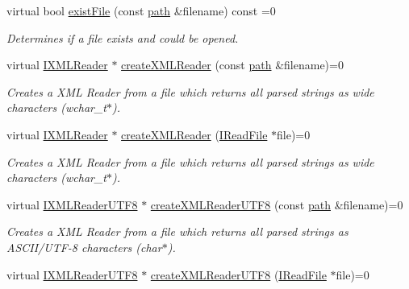 \begin{DoxyCompactItemize}
virtual bool \hyperlink{classirr_1_1io_1_1IFileSystem_a1c5e98bc16e38b1d15b44e24b1b3bd32}{exist\+File} (const \hyperlink{namespaceirr_1_1io_a6468281622ce3a1c46b72e19f32dded5}{path} \&filename) const =0
\begin{DoxyCompactList}\small\item\em Determines if a file exists and could be opened. \end{DoxyCompactList}\item 
virtual \hyperlink{namespaceirr_1_1io_ab620b13630f0818f3eefc000f6917fe4}{I\+X\+M\+L\+Reader} $\ast$ \hyperlink{classirr_1_1io_1_1IFileSystem_a167c9fa159d16ee5c56c074636b0865e}{create\+X\+M\+L\+Reader} (const \hyperlink{namespaceirr_1_1io_a6468281622ce3a1c46b72e19f32dded5}{path} \&filename)=0
\begin{DoxyCompactList}\small\item\em Creates a X\+ML Reader from a file which returns all parsed strings as wide characters (wchar\+\_\+t$\ast$). \end{DoxyCompactList}\item 
virtual \hyperlink{namespaceirr_1_1io_ab620b13630f0818f3eefc000f6917fe4}{I\+X\+M\+L\+Reader} $\ast$ \hyperlink{classirr_1_1io_1_1IFileSystem_a38f4c90db3fd1b21473ce0cd2437bb59}{create\+X\+M\+L\+Reader} (\hyperlink{classirr_1_1io_1_1IReadFile}{I\+Read\+File} $\ast$file)=0
\begin{DoxyCompactList}\small\item\em Creates a X\+ML Reader from a file which returns all parsed strings as wide characters (wchar\+\_\+t$\ast$). \end{DoxyCompactList}\item 
virtual \hyperlink{namespaceirr_1_1io_a87616ca0bcc3d6424d2c2edfcb743193}{I\+X\+M\+L\+Reader\+U\+T\+F8} $\ast$ \hyperlink{classirr_1_1io_1_1IFileSystem_affd8f622ac7c3dcd507f20f9cd23b21f}{create\+X\+M\+L\+Reader\+U\+T\+F8} (const \hyperlink{namespaceirr_1_1io_a6468281622ce3a1c46b72e19f32dded5}{path} \&filename)=0
\begin{DoxyCompactList}\small\item\em Creates a X\+ML Reader from a file which returns all parsed strings as A\+S\+C\+I\+I/\+U\+T\+F-\/8 characters (char$\ast$). \end{DoxyCompactList}\item 
virtual \hyperlink{namespaceirr_1_1io_a87616ca0bcc3d6424d2c2edfcb743193}{I\+X\+M\+L\+Reader\+U\+T\+F8} $\ast$ \hyperlink{classirr_1_1io_1_1IFileSystem_acda42a761d3b2fb4d39ad1d9e2ada973}{create\+X\+M\+L\+Reader\+U\+T\+F8} (\hyperlink{classirr_1_1io_1_1IReadFile}{I\+Read\+File} $\ast$file)=0

\end{DoxyCompactItemize}
